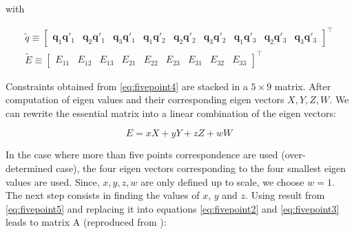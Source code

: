 \documentclass[11pt]{report}
\begin{document}
with 

\begin{align}
\tilde{q} \equiv \left [ \begin{matrix} \mathbf{q}_1\mathbf{q}'_1 &
  \mathbf{q}_2\mathbf{q}'_1 &
 \mathbf{q}_3\mathbf{q}'_1 &
 \mathbf{q}_1\mathbf{q}'_2 &
 \mathbf{q}_2\mathbf{q}'_2 &
 \mathbf{q}_3\mathbf{q}'_2 &
 \mathbf{q}_1\mathbf{q}'_3 & 
 \mathbf{q}_2\mathbf{q}'_3 &
 \mathbf{q}_3\mathbf{q}'_3
 \end{matrix} \right]^\top \\
\tilde{E} \equiv \left [ 
\begin{matrix}
E_{11} & 
E_{12} & 
E_{13} & 
E_{21} & 
E_{22} & 
E_{23} & 
E_{31} & 
E_{32} &
E_{33} 
\end{matrix}
\right ] ^\top
\end{align}


Constraints obtained from \ref{eq:fivepoint4} are stacked in a $5\times 9$ matrix. After computation of eigen values and their corresponding eigen vectors $X, Y, Z, W$. We can rewrite the essential matrix into a linear combination of the eigen vectors:

\begin{equation}
  \label{eq:fivepoint5}
  E = xX + yY + zZ + wW  
\end{equation}

In the case where more than five points correspondence are used (over-determined case), the four eigen vectors corresponding to the four smallest eigen values are used. Since, $x, y, z, w$ are only defined up to scale, we choose $w=1$. The next step consists in finding the values of $x$, $y$ and $z$. Using result from \ref{eq:fivepoint5} and replacing it into equations \ref{eq:fivepoint2} and \ref{eq:fivepoint3} leads to matrix A (reproduced from \cite{FivePointNister04}):
\end{document}
